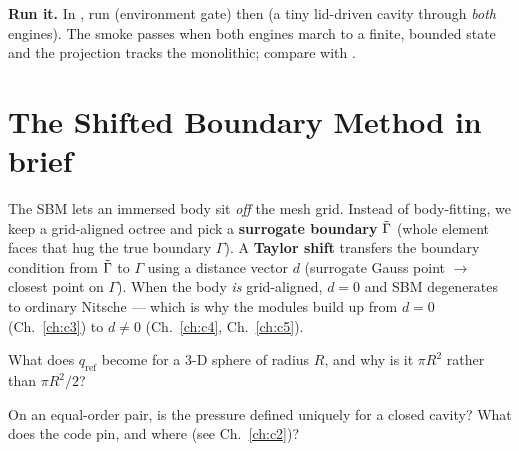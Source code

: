 \begin{runbox}\textbf{Run it.} In , run
 (environment gate) then 
(a tiny lid-driven cavity through \emph{both} engines). The smoke passes
when both engines march to a finite, bounded state and the projection
tracks the monolithic; compare with .\end{runbox}

\section{The Shifted Boundary Method in brief}
The SBM lets an immersed body sit \emph{off} the mesh grid. Instead of
body-fitting, we keep a grid-aligned octree and pick a \textbf{surrogate
boundary} $\tilde\Gamma$ (whole element faces that hug the true boundary
$\Gamma$). A \textbf{Taylor shift} transfers the boundary condition from
$\tilde\Gamma$ to $\Gamma$ using a distance vector $d$ (surrogate Gauss point
$\to$ closest point on $\Gamma$). When the body \emph{is} grid-aligned,
$d=0$ and SBM degenerates to ordinary Nitsche --- which is why the modules
build up from $d=0$ (Ch.~\ref{ch:c3}) to $d\neq0$ (Ch.~\ref{ch:c4},
Ch.~\ref{ch:c5}).

\question What does $q_{\text{ref}}$ become for a 3-D sphere of radius $R$,
and why is it $\pi R^2$ rather than $\pi R^2/2$?

\question On an equal-order pair, is the pressure defined uniquely for a
closed cavity? What does the code pin, and where (see
Ch.~\ref{ch:c2})?
